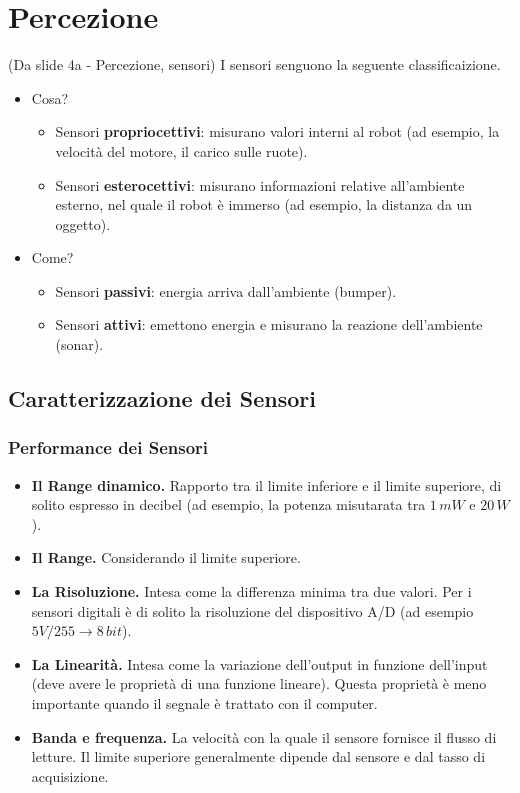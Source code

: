 \documentclass[a4paper,portrait,12pt]{article}
\theoremstyle{definition}
\begin{document}
\section{Percezione}



(Da slide 4a - Percezione, sensori) I sensori senguono la seguente classificaizione.
\begin{itemize}
\item Cosa?
	\begin{itemize}
	\item Sensori \textbf{propriocettivi}: misurano valori interni al robot (ad esempio, la velocità del motore, il carico sulle ruote).
	\item Sensori \textbf{esterocettivi}: misurano informazioni relative all'ambiente esterno, nel quale il robot è immerso (ad esempio, la distanza da un oggetto). 
	\end{itemize}
\item Come?
	\begin{itemize}
	\item Sensori \textbf{passivi}: energia arriva dall'ambiente (bumper).
	\item Sensori \textbf{attivi}: emettono energia e misurano la reazione dell'ambiente (sonar).
	\end{itemize}
\end{itemize}

\subsection{Caratterizzazione dei Sensori}

\subsubsection{Performance dei Sensori}
\begin{itemize}
\item \textbf{Il Range dinamico.} Rapporto tra il limite inferiore e il limite superiore, di solito espresso in decibel (ad esempio, la potenza misutarata tra $1\,mW$ e $20\,W$).
\item \textbf{Il Range.} Considerando il limite superiore.
\item \textbf{La Risoluzione.} Intesa come la differenza minima tra due valori.
Per i sensori digitali è di solito la risoluzione del dispositivo A/D (ad esempio $5V / 255 \rightarrow 8\,bit$).
\item \textbf{La Linearità.} Intesa come la variazione dell'output in funzione dell'input (deve avere le proprietà di una funzione lineare).
Questa proprietà è meno importante quando il segnale è trattato con il computer.
\item \textbf{Banda e frequenza.} La velocità con la quale il sensore fornisce il flusso di letture.
Il limite superiore generalmente dipende dal sensore e dal tasso di acquisizione.
\end{itemize}
\end{document}
